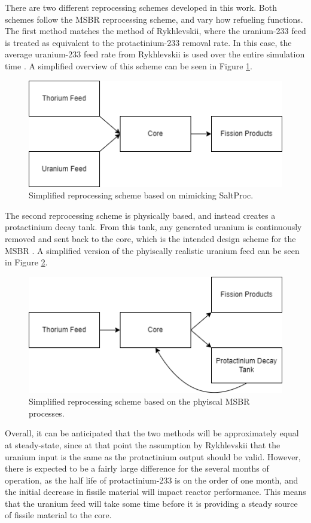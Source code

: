 There are two different reprocessing schemes developed in this work. Both schemes follow the MSBR reprocessing scheme, and vary how refueling functions. The first method matches the method of Rykhlevskii, where the uranium-233 feed is treated as equivalent to the protactinium-233 removal rate. In this case, the average uranium-233 feed rate from Rykhlevskii is used over the entire simulation time \cite{rykhlevskii_advanced_2018}. A simplified overview of this scheme can be seen in Figure \ref{fig:spmatchrepr}.


\begin{figure}[H]
  \centering
  \includegraphics[scale=0.45]{images/sp-match-repr-scheme.png}
  \caption{Simplified reprocessing scheme based on mimicking SaltProc.}
   \label{fig:spmatchrepr}
\end{figure}

The second reprocessing scheme is physically based, and instead creates a protactinium decay tank. From this tank, any generated uranium is continuously removed and sent back to the core, which is the intended design scheme for the MSBR \cite{robertson_conceptual_1971}. A simplified version of the phyiscally realistic uranium feed can be seen in Figure \ref{fig:nonspmatchrepr}.

\begin{figure}[H]
  \centering
  \includegraphics[scale=0.45]{images/phys-repr-scheme.png}
  \caption{Simplified reprocessing scheme based on the phyiscal MSBR processes.}
   \label{fig:nonspmatchrepr}
\end{figure}

Overall, it can be anticipated that the two methods will be approximately equal at steady-state, since at that point the assumption by Rykhlevskii that the uranium input is the same as the protactinium output should be valid. However, there is expected to be a fairly large difference for the several months of operation, as the half life of protactinium-233 is on the order of one month, and the initial decrease in fissile material will impact reactor performance. This means that the uranium feed will take some time before it is providing a steady source of fissile material to the core.

